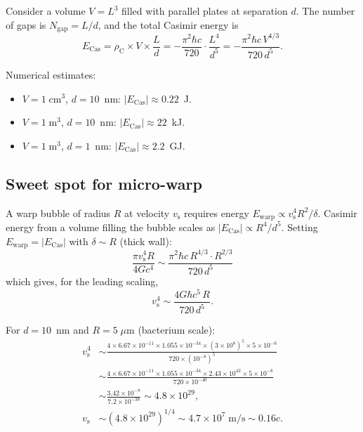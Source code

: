\documentclass[prd,twocolumn,superscriptaddress,longbibliography]{revtex4-2}
\newcommand{\vs}{v_{\mathrm{s}}}
\newcommand{\Ewarp}{E_{\mathrm{warp}}}
\newcommand{\Ecas}{E_{\mathrm{Cas}}}
\begin{document}
Consider a volume $V = L^3$ filled with parallel plates at
separation $d$.  The number of gaps is $N_{\mathrm{gap}} = L/d$,
and the total Casimir energy is
\begin{equation}
\Ecas = \rho_{\mathrm{C}}\times V\times\frac{L}{d}
= -\frac{\pi^2\hbar c}{720}\cdot\frac{L^4}{d^5}
= -\frac{\pi^2\hbar c\,V^{4/3}}{720\,d^5}.
\end{equation}

Numerical estimates:
\begin{itemize}
\item $V = 1\;\mathrm{cm}^3$, $d = 10$~nm:
$|\Ecas| \approx 0.22$~J.
\item $V = 1\;\mathrm{m}^3$, $d = 10$~nm:
$|\Ecas| \approx 22$~kJ.
\item $V = 1\;\mathrm{m}^3$, $d = 1$~nm:
$|\Ecas| \approx 2.2$~GJ.
\end{itemize}

\subsection{Sweet spot for micro-warp}

A warp bubble of radius $R$ at velocity $\vs$ requires energy
$\Ewarp \propto \vs^4 R^2/\delta$.  Casimir energy from a
volume filling the bubble scales as $|\Ecas| \propto R^4/d^5$.
Setting $\Ewarp = |\Ecas|$ with $\delta \sim R$ (thick wall):
\begin{equation}
\frac{\pi\vs^4 R}{4Gc^4}
\sim \frac{\pi^2\hbar c\,R^{4/3}\cdot R^{2/3}}{720\,d^5}
\end{equation}
which gives, for the leading scaling,
\begin{equation}
\vs^4 \sim \frac{4G\hbar c^5\,R}{720\,d^5}.
\end{equation}

For $d = 10$~nm and $R = 5\;\mu$m (bacterium scale):
\begin{align}
\vs^4 &\sim
\frac{4\times 6.67\times 10^{-11}\times 1.055\times 10^{-34}
\times (3\times 10^8)^5\times 5\times 10^{-6}}
{720\times(10^{-8})^5}
\nonumber\\
&\sim
\frac{4\times 6.67\times 10^{-11}\times 1.055\times 10^{-34}
\times 2.43\times 10^{42}\times 5\times 10^{-6}}
{720\times 10^{-40}}
\nonumber\\
&\sim
\frac{3.42\times 10^{-8}}{7.2\times 10^{-38}}
\sim 4.8\times 10^{29},
\nonumber\\
\vs &\sim (4.8\times 10^{29})^{1/4}
\sim 4.7\times 10^{7}\;\mathrm{m/s}\sim 0.16c.
\label{eq:casimir_v}
\end{align}
\end{document}
